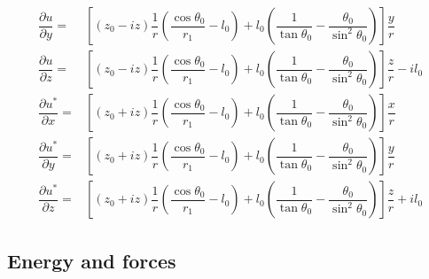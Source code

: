 \documentclass[12pt]{article}
\begin{document}
\begin{eqnarray}\label{eqn:du}
\dfrac{\partial u}{\partial y}=&\left[\left(z_0-iz\right)\dfrac{1}{r}\left(\dfrac{\cos \theta_0}{r_1}-l_0\right)+l_0 \left(\dfrac{1}{\tan \theta_0}-\dfrac{\theta_0}{\sin^2\theta_0}\right)\right]\dfrac{y}{r} \nonumber \\
\dfrac{\partial u}{\partial z}=&\left[\left(z_0-iz\right)\dfrac{1}{r}\left(\dfrac{\cos \theta_0}{r_1}-l_0\right)+l_0 \left(\dfrac{1}{\tan \theta_0}-\dfrac{\theta_0}{\sin^2\theta_0}\right)\right]\dfrac{z}{r}-i l_0 \nonumber \\
\dfrac{\partial u^\ast}{\partial x}=&\left[\left(z_0+iz\right)\dfrac{1}{r}\left(\dfrac{\cos \theta_0}{r_1}-l_0\right)+l_0 \left(\dfrac{1}{\tan \theta_0}-\dfrac{\theta_0}{\sin^2\theta_0}\right)\right]\dfrac{x}{r} \\
\dfrac{\partial u^\ast}{\partial y}=&\left[\left(z_0+iz\right)\dfrac{1}{r}\left(\dfrac{\cos \theta_0}{r_1}-l_0\right)+l_0 \left(\dfrac{1}{\tan \theta_0}-\dfrac{\theta_0}{\sin^2\theta_0}\right)\right]\dfrac{y}{r} \nonumber \\
\dfrac{\partial u^\ast}{\partial z}=&\left[\left(z_0+iz\right)\dfrac{1}{r}\left(\dfrac{\cos \theta_0}{r_1}-l_0\right)+l_0 \left(\dfrac{1}{\tan \theta_0}-\dfrac{\theta_0}{\sin^2\theta_0}\right)\right]\dfrac{z}{r}+i l_0 \nonumber 
\end{eqnarray}


	\subsection{Energy and forces}
\end{document}
